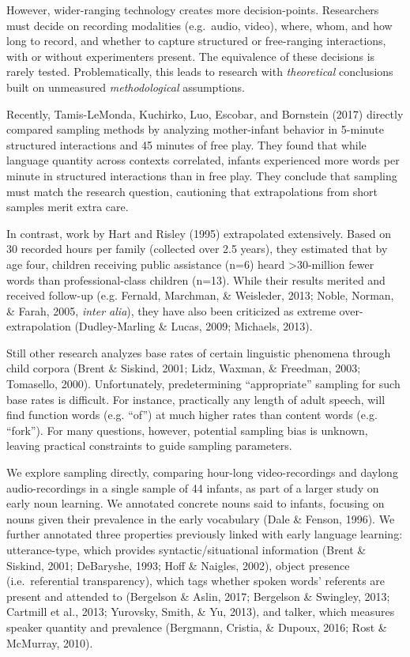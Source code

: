 \documentclass[man]{apa6}
\theoremstyle{definition}
\theoremstyle{definition}
\theoremstyle{definition}
\theoremstyle{remark}
\begin{document}
However, wider-ranging technology creates more decision-points.
Researchers must decide on recording modalities (e.g.~audio, video),
where, whom, and how long to record, and whether to capture structured
or free-ranging interactions, with or without experimenters present. The
equivalence of these decisions is rarely tested. Problematically, this
leads to research with \emph{theoretical} conclusions built on
unmeasured \emph{methodological} assumptions.

Recently, Tamis-LeMonda, Kuchirko, Luo, Escobar, and Bornstein (2017)
directly compared sampling methods by analyzing mother-infant behavior
in 5-minute structured interactions and 45 minutes of free play. They
found that while language quantity across contexts correlated, infants
experienced more words per minute in structured interactions than in
free play. They conclude that sampling must match the research question,
cautioning that extrapolations from short samples merit extra care.

In contrast, work by Hart and Risley (1995) extrapolated extensively.
Based on 30 recorded hours per family (collected over 2.5 years), they
estimated that by age four, children receiving public assistance (n=6)
heard \textgreater{}30-million fewer words than professional-class
children (n=13). While their results merited and received follow-up
(e.g. Fernald, Marchman, \& Weisleder, 2013; Noble, Norman, \& Farah,
2005, \emph{inter alia}), they have also been criticized as extreme
over-extrapolation (Dudley-Marling \& Lucas, 2009; Michaels, 2013).

Still other research analyzes base rates of certain linguistic phenomena
through child corpora (Brent \& Siskind, 2001; Lidz, Waxman, \&
Freedman, 2003; Tomasello, 2000). Unfortunately, predetermining
\enquote{appropriate} sampling for such base rates is difficult. For
instance, practically any length of adult speech, will find function
words (e.g. \enquote{of}) at much higher rates than content words (e.g.
\enquote{fork}). For many questions, however, potential sampling bias is
unknown, leaving practical constraints to guide sampling parameters.

We explore sampling directly, comparing hour-long video-recordings and
daylong audio-recordings in a single sample of 44 infants, as part of a
larger study on early noun learning. We annotated concrete nouns said to
infants, focusing on nouns given their prevalence in the early
vocabulary (Dale \& Fenson, 1996). We further annotated three properties
previously linked with early language learning: utterance-type, which
provides syntactic/situational information (Brent \& Siskind, 2001;
DeBaryshe, 1993; Hoff \& Naigles, 2002), object presence
(i.e.~referential transparency), which tags whether spoken words'
referents are present and attended to (Bergelson \& Aslin, 2017;
Bergelson \& Swingley, 2013; Cartmill et al., 2013; Yurovsky, Smith, \&
Yu, 2013), and talker, which measures speaker quantity and prevalence
(Bergmann, Cristia, \& Dupoux, 2016; Rost \& McMurray, 2010).
\end{document}
